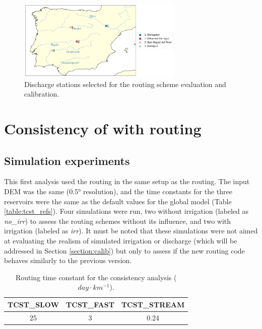\begin{figure}[htbp]
    \centering
    \includegraphics[width=0.7\textwidth]{images/chap3/river_discharge/halfdeg_4stations_map.png}
    \caption{Discharge stations selected for the routing scheme evaluation and calibration.}
    \label{fig:halfedg_stations_map}
\end{figure}

\section{Consistency of \native with \std routing}
\subsection{Simulation experiments}

This first analysis used the \native routing in the same setup as the \std routing. 
The input DEM was the same (0.5° resolution), and the time constants for the three reservoirs were the same as the default values for the global model (Table \ref{table:tcst_refs}).
Four simulations were run, two without irrigation (labeled as \textit{no\_irr}) to assess the routing schemes without its influence, and two with irrigation (labeled as \textit{irr}). It must be noted that these simulations were not aimed at evaluating the realism of simulated irrigation or discharge (which will be addressed in Section \ref{section:calib}) but only to assess if the new routing code behaves similarly to the previous version.

\begin{table}[h]
\centering
\begin{tabular}{|c|c|c|}
\hline
\textbf{TCST\_SLOW} & \textbf{TCST\_FAST} & \textbf{TCST\_STREAM} \\ \hline
25            & 3             & 0.24            \\ \hline
\end{tabular}
\caption{Routing time constant for the consistency analysis ($day \cdot km^{-1}$).}
\label{table:tcst_consistency}
\end{table}

